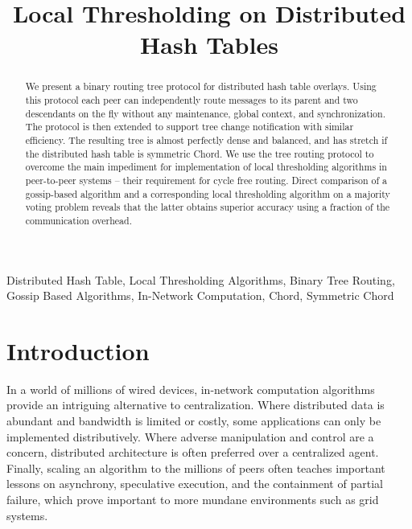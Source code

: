 \documentclass[12pt,english,journal]{elsarticle}
\numberwithin{equation}{section}
\numberwithin{figure}{section}
\theoremstyle{plain}
\theoremstyle{plain}
\begin{document}
\title{Local Thresholding on Distributed Hash Tables}
\begin{abstract}
We present a binary routing tree protocol for distributed hash table
overlays. Using this protocol each peer can independently route messages
to its parent and two descendants on the fly without any maintenance,
global context, and synchronization. The protocol is then extended
to support tree change notification with similar efficiency. The resulting
tree is almost perfectly dense and balanced, and has 
stretch if the distributed hash table is symmetric Chord. We use the
tree routing protocol to overcome the main impediment for implementation
of local thresholding algorithms in peer-to-peer systems -- their
requirement for cycle free routing. Direct comparison of a gossip-based
algorithm and a corresponding local thresholding algorithm on a majority
voting problem reveals that the latter obtains superior accuracy using
a fraction of the communication overhead.\end{abstract}
\begin{keyword}
Distributed Hash Table, Local Thresholding Algorithms, Binary Tree
Routing, Gossip Based Algorithms, In-Network Computation, Chord, Symmetric
Chord
\end{keyword}
\maketitle

\section{Introduction}

In a world of millions of wired devices, in-network computation algorithms
provide an intriguing alternative to centralization. Where distributed
data is abundant and bandwidth is limited or costly, some applications
can only be implemented distributively. Where adverse manipulation
and control are a concern, distributed architecture is often preferred
over a centralized agent. Finally, scaling an algorithm to the millions
of peers often teaches important lessons on asynchrony, speculative
execution, and the containment of partial failure, which prove important
to more mundane environments such as grid systems.
\end{document}
